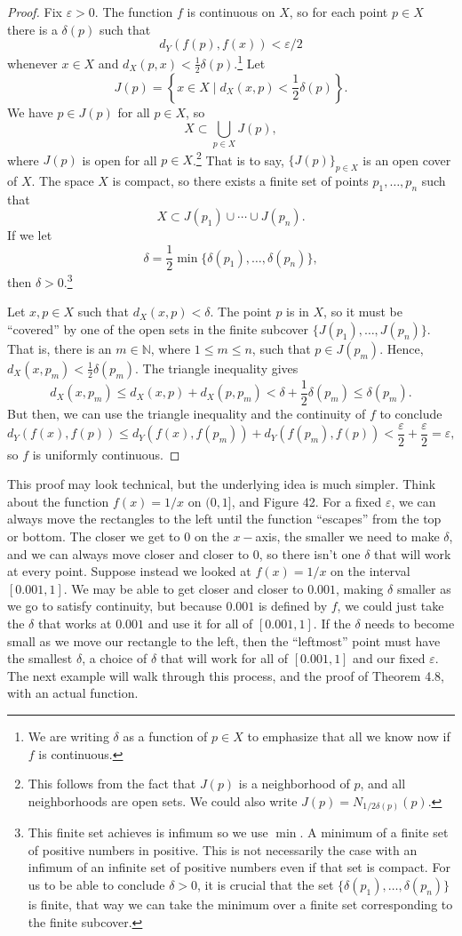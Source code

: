 \documentclass{article}
\newcommand{\N}{\mathbb{N}}
\theoremstyle{definition}
\begin{document}
	\begin{proof}
		Fix $ \varepsilon>0 $. The function $ f $ is continuous on $ X $, so for each point $ p\in X $ there is a $ \delta(p) $ such that $$d_Y(f(p),f(x))<\varepsilon/2 $$ whenever $ x\in X $ and $ d_X(p,x)<\frac{1}{2}\delta(p) $.\footnote{We are writing $ \delta $ as a function of $ p\in X $ to emphasize that all we know now if $ f $ is continuous.} Let $$ J(p)=\left\{x\in X \mid d_X(x,p)<\frac{1}{2}\delta(p)\right\} .$$ We have $ p\in J(p) $ for all $ p\in X $, so $$X\subset\bigcup_{p\in X}J(p),$$ where $ J(p) $ is open for all $ p\in X $.\footnote{This follows from the fact that $ J(p) $ is a neighborhood of $ p $, and all neighborhoods are open sets. We could also write $ J(p)=N_{1/2\delta(p)}(p) $.} That is to say, $ \{J(p)\}_{p\in X} $ is an open cover of $ X $. The space $ X $ is compact, so there exists a finite set of points $ p_1,\ldots,p_n $ such that $$ X\subset J(p_1)\cup\cdots\cup J(p_n).$$ If we let $$ \delta=\frac{1}{2}\min\{\delta(p_1),\ldots,\delta(p_n)\},$$ then $ \delta>0 $.\footnote{This finite set achieves is infimum so we use $ \min $. A minimum of a finite set of positive numbers in positive. This is not necessarily the case with an infimum of an infinite set of positive numbers even if that set is compact. For us to be able to conclude $ \delta>0 $, it is crucial that the set $ \{\delta(p_1),\ldots,\delta(p_n)\} $ is finite, that way we can take the minimum over a finite set corresponding to the finite subcover. }
		
		Let $ x,p\in X $ such that $ d_X(x,p)<\delta $. The point $ p $ is in $ X $, so it must be ``covered'' by one of the open sets in the finite subcover $ \{J(p_1),\ldots,J(p_n)\} $. That is, there is an $ m\in\N $, where $ 1\le m\le n $, such that $ p\in J(p_m) $. Hence, $d_X(x,p_m)<\frac{1}{2}\delta(p_m) $. The triangle inequality gives $$d_X(x,p_m)\le d_X(x,p)+d_X(p,p_m)<\delta+\frac{1}{2}\delta(p_m)\le\delta(p_m) .$$ But then, we can use the triangle inequality and the continuity of $ f $ to conclude $$d_Y(f(x),f(p))\le d_Y(f(x),f(p_m))+d_Y(f(p_m),f(p))<\frac{\varepsilon}{2}+\frac{\varepsilon}{2}=\varepsilon ,$$ so $ f $ is uniformly continuous.
	\end{proof}
	This proof may look technical, but the underlying idea is much simpler. Think about the function $ f(x)=1/x $ on $ (0,1] $, and Figure 42. For a fixed $ \varepsilon $, we can always move the rectangles to the left until the function ``escapes'' from the top or bottom. The closer we get to $ 0 $ on the $ x -$axis, the smaller we need to make $ \delta $, and we can always move closer and closer to $ 0 $, so there isn't one $ \delta $ that will work at every point. Suppose instead we looked at $ f(x)=1/x $ on the interval $ [0.001,1] $. We may be able to get closer and closer to $ 0.001 $, making $ \delta $ smaller as we go to satisfy continuity, but because $ 0.001 $ is defined by $ f $, we could just take the $ \delta $ that works at $ 0.001 $ and use it for all of $ [0.001,1] $. If the $ \delta $ needs to become small as we move our rectangle to the left, then the ``leftmost'' point must have the smallest $ \delta $, a choice of $ \delta $ that will work for all of $ [0.001,1] $ and our fixed $ \varepsilon $. The next example will walk through this process, and the proof of Theorem 4.8, with an actual function. 
\end{document}
